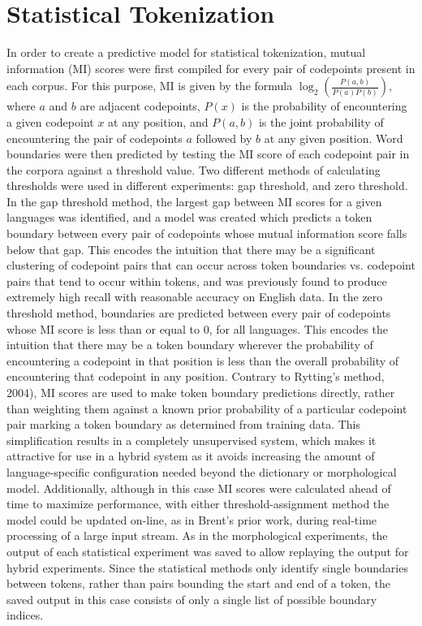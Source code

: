 \section{Statistical Tokenization}
In order to create a predictive model for statistical tokenization, mutual information (MI) scores were first compiled for every pair of codepoints present in each corpus. For this purpose, MI is given by the formula $\log_2(\frac{P(a,b)}{P(a)P(b)})$, where $a$ and $b$ are adjacent codepoints, $P(x)$ is the probability of encountering a given codepoint $x$ at any position, and $P(a,b)$ is the joint probability of encountering the pair of codepoints $a$ followed by $b$ at any given position. Word boundaries were then predicted by testing the MI score of each codepoint pair in the corpora against a threshold value.
Two different methods of calculating thresholds were used in different experiments: gap threshold, and zero threshold. In the gap threshold method, the largest gap between MI scores for a given languages was identified, and a model was created which predicts a token boundary between every pair of codepoints whose mutual information score falls below that gap. This encodes the intuition that there may be a significant clustering of codepoint pairs that can occur across token boundaries vs. codepoint pairs that tend to occur within tokens, and was previously found to produce extremely high recall with reasonable accuracy on English data\cite{kearsley14}. In the zero threshold method, boundaries are predicted between every pair of codepoints whose MI score is less than or equal to 0, for all languages. This encodes the intuition that there may be a token boundary wherever the probability of encountering a codepoint in that position is less than the overall probability of encountering that codepoint in any position.
Contrary to Rytting's method\cite{rytting04}, 2004), MI scores are used to make token boundary predictions directly, rather than weighting them against a known prior probability of a particular codepoint pair marking a token boundary as determined from training data. This simplification results in a completely unsupervised system, which makes it attractive for use in a hybrid system as it avoids increasing the amount of language-specific configuration needed beyond the dictionary or morphological model. Additionally, although in this case MI scores were calculated ahead of time to maximize performance, with either threshold-assignment method the model could be updated on-line, as in Brent's prior work\cite{brent99}, during real-time processing of a large input stream.
As in the morphological experiments, the output of each statistical experiment was saved to allow replaying the output for hybrid experiments. Since the statistical methods only identify single boundaries between tokens, rather than pairs bounding the start and end of a token, the saved output in this case consists of only a single list of possible boundary indices.

